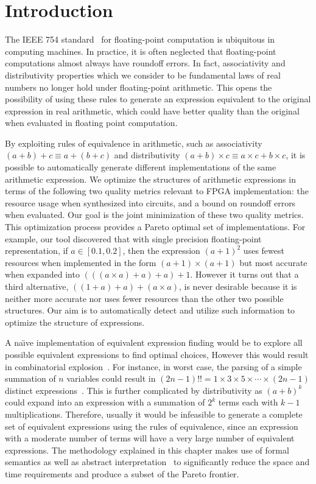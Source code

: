 \section{Introduction}
\label{sec:introduction}

The IEEE 754 standard~\cite{ieee754} for floating-point computation is
ubiquitous in computing machines. In practice, it is often neglected that
floating-point computations almost always have roundoff errors. In fact,
associativity and distributivity properties which we consider to be fundamental
laws of real numbers no longer hold under floating-point arithmetic. This opens
the possibility of using these rules to generate an expression equivalent to
the original expression in real arithmetic, which could have better quality
than the original when evaluated in floating point computation.

By exploiting rules of equivalence in arithmetic, such as associativity $(a
+ b) + c \equiv a + (b + c)$ and distributivity $(a + b) \times c \equiv a
\times c + b \times c$, it is possible to automatically generate different
implementations of the same arithmetic expression. We optimize the structures
of arithmetic expressions in terms of the following two quality metrics
relevant to FPGA implementation: the resource usage when synthesized into
circuits, and a bound on roundoff errors when evaluated. Our goal is the joint
minimization of these two quality metrics. This optimization process provides
a Pareto optimal set of implementations. For example, our tool discovered that
with single precision floating-point representation, if $a \in [0.1, 0.2]$,
then the expression ${(a + 1)}^2$ uses fewest resources when implemented in the
form $(a + 1) \times (a + 1)$ but most accurate when expanded into $(((a \times
a) + a) + a) + 1$. However it turns out that a third alternative, $((1 + a)
+ a) + (a \times a)$, is never desirable because it is neither more accurate
nor uses fewer resources than the other two possible structures. Our aim is to
automatically detect and utilize such information to optimize the structure of
expressions.

A na{\"\i}ve implementation of equivalent expression finding would be to
explore all possible equivalent expressions to find optimal choices, However
this would result in combinatorial explosion~\cite{ioualalen}. For instance,
in worst case, the parsing of a simple summation of $n$ variables could
result in $(2n - 1)!! = 1\times3\times5\times\cdots\times(2n - 1)$ distinct
expressions~\cite{ioualalen, mouilleron}. This is further complicated by
distributivity as ${(a + b)}^k$ could expand into an expression with a
summation of $2^k$ terms each with $k - 1$ multiplications. Therefore, usually
it would be infeasible to generate a complete set of equivalent expressions
using the rules of equivalence, since an expression with a moderate number of
terms will have a very large number of equivalent expressions. The methodology
explained in this chapter makes use of formal semantics as well as abstract
interpretation~\cite{cousot77} to significantly reduce the space and time
requirements and produce a subset of the Pareto frontier.

